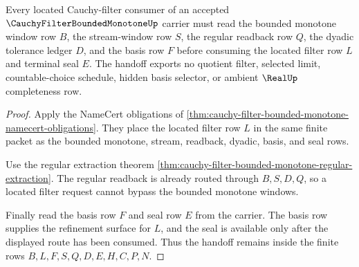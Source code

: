 \begin{theorem}
\label{thm:cauchy-filter-bounded-monotone-located-filter-handoff}
Every located Cauchy-filter consumer of an accepted $\CauchyFilterBoundedMonotoneUp$ carrier must read the bounded monotone window row $B$, the stream-window row $S$, the regular readback row $Q$, the dyadic tolerance ledger $D$, and the basis row $F$ before consuming the located filter row $L$ and terminal seal $E$. The handoff exports no quotient filter, selected limit, countable-choice schedule, hidden basis selector, or ambient $\RealUp$ completeness row.
\end{theorem}
\begin{proof}
Apply the NameCert obligations of \autoref{thm:cauchy-filter-bounded-monotone-namecert-obligations}. They place the located filter row $L$ in the same finite packet as the bounded monotone, stream, readback, dyadic, basis, and seal rows.

Use the regular extraction theorem \autoref{thm:cauchy-filter-bounded-monotone-regular-extraction}. The regular readback is already routed through $B,S,D,Q$, so a located filter request cannot bypass the bounded monotone windows.

Finally read the basis row $F$ and seal row $E$ from the carrier. The basis row supplies the refinement surface for $L$, and the seal is available only after the displayed route has been consumed. Thus the handoff remains inside the finite rows $B,L,F,S,Q,D,E,H,C,P,N$.
\end{proof}




